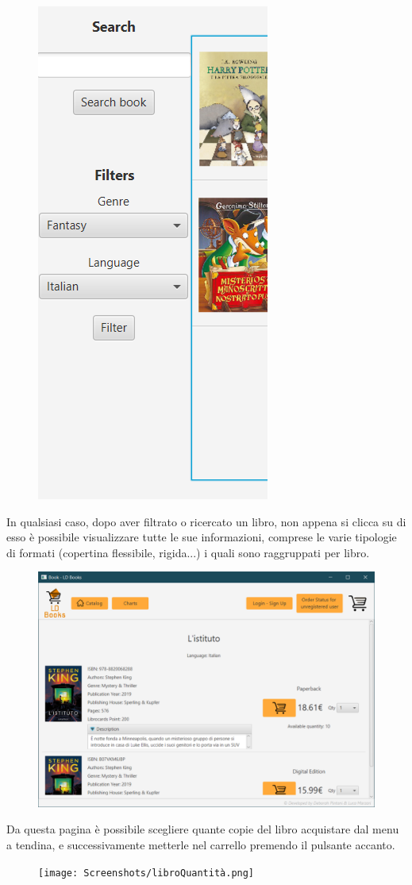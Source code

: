 \documentclass[a4paper,11pt]{report}
\begin{document}
\begin{figure}[h!]
	\centering
	\includegraphics[width=0.3\linewidth]{Screenshots/filtroLibro.png}
\end{figure}

In qualsiasi caso, dopo aver filtrato o ricercato un libro, non appena si clicca su di esso è possibile visualizzare tutte le sue informazioni, comprese le varie tipologie di formati (copertina flessibile, rigida...) i quali sono raggruppati per libro.

\begin{figure}[h!]
	\centering
	\includegraphics[width=0.8\linewidth]{Screenshots/libroSpecifico.png}
\end{figure}

Da questa pagina è possibile scegliere quante copie del libro acquistare dal menu a tendina, e successivamente metterle nel carrello premendo il pulsante accanto.
\newpage

\begin{figure}[h!]
	\centering
	\texttt{[image: Screenshots/libroQuantità.png]}
\end{figure}
\end{document}
